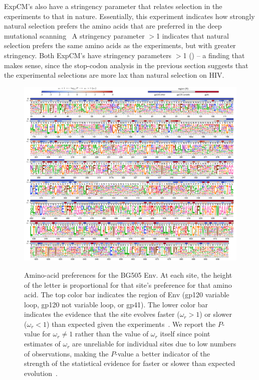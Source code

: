 \documentclass[9pt]{elife}
\begin{document}
ExpCM's also have a stringency parameter that relates selection in the experiments to that in nature.
Essentially, this experiment indicates how strongly natural selection prefers the amino acids that are preferred in the deep mutational scanning~\citep{hilton2017phydms}
A stringency parameter $>$1 indicates that natural selection prefers the same amino acids as the experiments, but with greater stringency.
Both ExpCM's have stringency parameters $>$1 () -- a finding that makes sense, since the stop-codon analysis in the previous section suggests that the experimental selections are more lax than natural selection on HIV.

\begin{figure}
\begin{fullwidth}
{\includegraphics[width=1.3\textwidth]{figures/BG505_prefs.pdf}}
\caption{\label{fig:BG505prefs}
Amino-acid preferences for the BG505 Env.
At each site, the height of the letter is proportional for that site's preference for that amino acid.
The top color bar indicates the region of Env (gp120 variable loop, gp120 not variable loop, or gp41).
The lower color bar indicates the evidence that the site evolves faster ($\omega_r > 1$) or slower ($\omega_r < 1$) than expected given the experiments~\citep[see the last section of the Results and][]{bloom2017identification}.
We report the $P$-value for $\omega_r \ne 1$ rather than the value of $\omega_r$ itself since point estimates of $\omega_r$ are unreliable for individual sites due to low numbers of observations, making the $P$-value a better indicator of the strength of the statistical evidence for faster or slower than expected evolution~\citep{kosakovsky2005not,murrell2012detecting}.
}
\end{fullwidth}
\end{figure}
\end{document}
